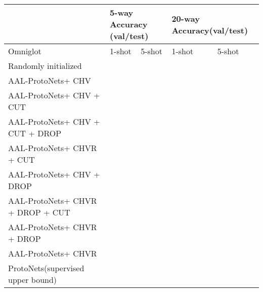 \documentclass{article}
\newcommand{\proto}{ProtoNets}
\newcommand{\uproto}{AAL-ProtoNets}
\begin{document}
\begin{table*}[!ht]
\begin{center}
\begin{tabular}{|l|l|l|l|l|}
\hline
                              & \multicolumn{2}{l|}{5-way Accuracy (val/test)}        & \multicolumn{2}{l|}{20-way Accuracy(val/test) } \\ \hline
Omniglot                                         & 1-shot             & 5-shot            & 1-shot              & 5-shot            \\ \hline
Randomly initialized                             & &  & &   \\ \hline
\uproto + CHV                              &  & & &   \\ \hline
\uproto + CHV  + CUT                        &  & & &   \\ \hline
\uproto + CHV  + CUT + DROP                 &  & & &   \\ \hline
\uproto + CHVR + CUT                    &  & & &   \\ \hline
\uproto + CHV  + DROP                       &  & & &   \\ \hline
\uproto + CHVR + DROP + CUT             &  & & &   \\ \hline
\uproto + CHVR + DROP                   &  & & &   \\ \hline
\uproto + CHVR                          &  & & &   \\ \hline
\proto (supervised upper bound)         &  & & &   \\ \hline


\end{tabular}
\caption{\uproto\ Omniglot ablation studies.}
\label{table:uproto-ablation-omniglot}
\end{center}
\vspace{-7mm}
\end{table*}
\end{document}
